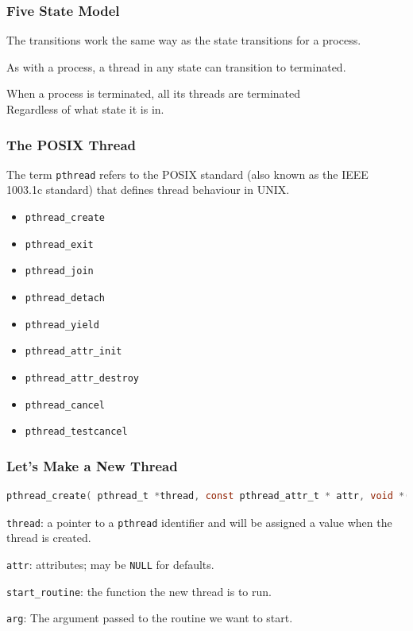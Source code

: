 \begin{frame}
	\frametitle{Five State Model}

	The transitions work the same way as the state transitions for a process.

	As with a process, a thread in any state can transition to terminated.

	When a process is terminated, all its threads are terminated\\
	\quad Regardless of what state it is in.


\end{frame}


\begin{frame}
	\frametitle{The POSIX Thread}

	The term \texttt{pthread} refers to the POSIX standard (also known as the IEEE 1003.1c standard) that defines thread behaviour in UNIX.

	\begin{itemize}
		\item \texttt{pthread\_create}
		\item \texttt{pthread\_exit}
		\item \texttt{pthread\_join}
		\item \texttt{pthread\_detach}
		\item \texttt{pthread\_yield}
		\item \texttt{pthread\_attr\_init}
		\item \texttt{pthread\_attr\_destroy}
		\item \texttt{pthread\_cancel}
		\item \texttt{pthread\_testcancel}
	\end{itemize}

\end{frame}


\begin{frame}[fragile]
	\frametitle{Let's Make a New Thread}

	\begin{lstlisting}[language=C]
pthread_create( pthread_t *thread, const pthread_attr_t * attr, void *(*start_routine)( void * ), void *arg );
\end{lstlisting}

	\texttt{thread}: a pointer to a \texttt{pthread} identifier and will be assigned a value when the thread is created.

	\texttt{attr}: attributes; may be \texttt{NULL} for defaults.

	\texttt{start\_routine}: the function the new thread is to run.

	\texttt{arg}: The argument passed to the routine we want to start.

\end{frame}


